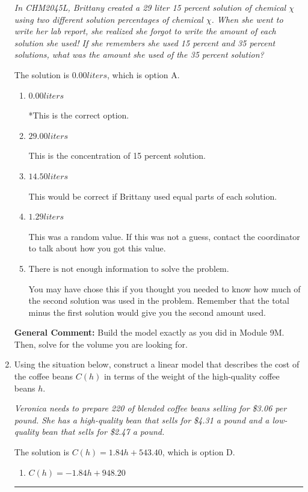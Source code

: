 \documentclass{extbook}[14pt]
\newcommand{\litem}[1]{\item #1

\rule{\textwidth}{0.4pt}}
\begin{document}
\begin{enumerate}
{\begin{center}
    \textit{ In CHM2045L, Brittany created a 29 liter 15 percent solution of chemical $\chi$ using two different solution percentages of chemical $\chi$. When she went to write her lab report, she realized she forgot to write the amount of each solution she used! If she remembers she used 15 percent and 35 percent solutions, what was the amount she used of the 35 percent solution? }
\end{center}
The solution is \( 0.00 liters \), which is option A.\begin{enumerate}[label=\Alph*.]
\item \( 0.00 liters \)

*This is the correct option.
\item \( 29.00 liters \)

This is the concentration of 15 percent solution.
\item \( 14.50 liters \)

This would be correct if Brittany used equal parts of each solution.
\item \( 1.29 liters \)

This was a random value. If this was not a guess, contact the coordinator to talk about how you got this value.
\item \( \text{There is not enough information to solve the problem.} \)

You may have chose this if you thought you needed to know how much of the second solution was used in the problem. Remember that the total minus the first solution would give you the second amount used.
\end{enumerate}

\textbf{General Comment:} Build the model exactly as you did in Module 9M. Then, solve for the volume you are looking for.
}
\litem{
Using the situation below, construct a linear model that describes the cost of the coffee beans $C(h)$ in terms of the weight of the high-quality coffee beans $h$.

\begin{center}
    \textit{ Veronica needs to prepare 220 of blended coffee beans selling for \$3.06 per pound. She has a high-quality bean that sells for \$4.31 a pound and a low-quality bean that sells for \$2.47 a pound. }
\end{center}
The solution is \( C(h) = 1.84 h + 543.40 \), which is option D.\begin{enumerate}[label=\Alph*.]
\item \( C(h) = -1.84 h + 948.20 \)


\end{enumerate}}
\end{enumerate}
\end{document}
